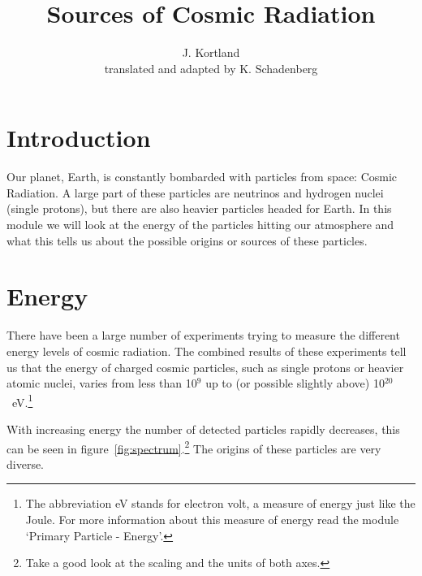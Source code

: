 \documentclass[12pt,a4paper]{article}
\author{J. Kortland \\ translated and adapted by K. Schadenberg}
\date{}
\title{Sources of Cosmic Radiation}
\numberwithin{equation}{section}
\numberwithin{figure}{section}
\numberwithin{table}{section}
\begin{document}
\maketitle

\section{Introduction}
Our planet, Earth, is constantly bombarded with particles from space: Cosmic Radiation. A large part of these particles are neutrinos and hydrogen nuclei (single protons), but there are also heavier particles headed for Earth.
In this module we will look at the energy of the particles hitting our atmosphere and what this tells us about the possible origins or sources of these particles.

\section{Energy}
There have been a large number of experiments trying to measure the different energy levels of cosmic radiation. The combined results of these experiments tell us that the energy of charged cosmic particles, such as single protons or heavier atomic nuclei, varies from less than 10$^9$ up to (or possible slightly above) 10$^{20}$~eV.\footnote{The abbreviation eV stands for electron volt, a measure of energy just like the Joule. For more information about this measure of energy read the module `Primary Particle - Energy'.}

With increasing energy the number of detected particles rapidly decreases, this can be seen in figure~\ref{fig:spectrum}.\footnote{Take a good look at the scaling and the units of both axes.} The origins of these particles are very diverse.
\end{document}
